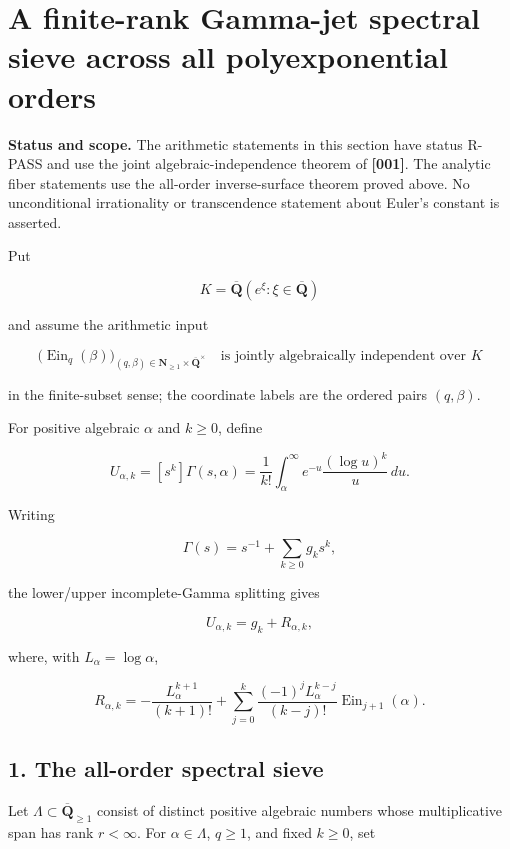 \documentclass[11pt]{article}
\theoremstyle{keio}
\theoremstyle{definition}
\theoremstyle{remark}
\newcommand{\RPASS}{\textcolor{keioxblue}{\textsf{R-PASS}}}
\begin{document}
\section{A finite-rank Gamma-jet spectral sieve across all polyexponential orders}

\begin{notebox}
\textbf{Status and scope.}  The arithmetic statements in this section have
status \RPASS{} and use the joint algebraic-independence theorem of
\textbf{[001]}.  The analytic fiber statements use the all-order inverse-surface
theorem proved above.  No unconditional irrationality or transcendence
statement about Euler's constant is asserted.
\end{notebox}

Put

\[
 K=\overline{\mathbf Q}
   (e^\xi:\xi\in\overline{\mathbf Q})
\]

and assume the arithmetic input

\[
 \bigl(\operatorname{Ein}_q(\beta)\bigr)_
 {(q,\beta)\in\mathbf N_{\geq1}\times
 \overline{\mathbf Q}^{\times}}
 \quad\text{is jointly algebraically independent over }K        \tag{GS-0.1}
\]

in the finite-subset sense; the coordinate labels are the ordered pairs
\((q,\beta)\).

For positive algebraic \(\alpha\) and \(k\geq0\), define

\[
 U_{\alpha,k}=[s^k]\Gamma(s,\alpha)
 =\frac1{k!}\int_\alpha^\infty
 e^{-u}\frac{(\log u)^k}{u}\,du.                              \tag{GS-0.2}
\]

Writing

\[
 \Gamma(s)=s^{-1}+\sum_{k\geq0}g_ks^k,
\]

the lower/upper incomplete-Gamma splitting gives

\[
 U_{\alpha,k}=g_k+R_{\alpha,k},                                \tag{GS-0.3}
\]

where, with \(L_\alpha=\log\alpha\),

\[
 R_{\alpha,k}=-\frac{L_\alpha^{k+1}}{(k+1)!}
 +\sum_{j=0}^k
 \frac{(-1)^jL_\alpha^{k-j}}{(k-j)!}
 \operatorname{Ein}_{j+1}(\alpha).                            \tag{GS-0.4}
\]

\subsection{1. The all-order spectral sieve}

Let \(\Lambda\subset\overline{\mathbf Q}_{\geq1}\) consist of distinct
positive algebraic numbers whose multiplicative span has rank \(r<\infty\).
For \(\alpha\in\Lambda\), \(q\geq1\), and fixed \(k\geq0\), set
\end{document}
